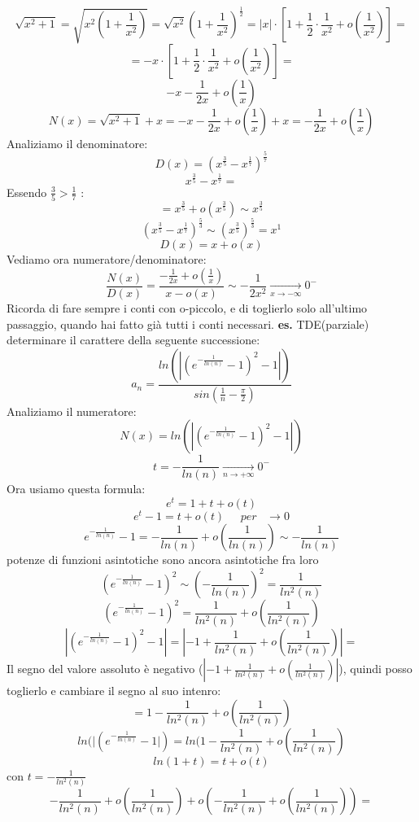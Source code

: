 \[
    \sqrt{x^2+1} = \sqrt{x^2(1+\frac{1}{x^2})} = \sqrt{x^2} (1 +\frac{1}{x^2})^{\frac{1}{2}} = |x| \cdot [1+\frac{1}{2}\cdot \frac{1}{x^2}+o(\frac{1}{x^2})] =
\]
\[
    = -x \cdot [1+\frac{1}{2}\cdot \frac{1}{x^2}+o(\frac{1}{x^2})] =
\]
\[
    -x - \frac{1}{2x} + o(\frac{1}{x})
\]
\[
    N(x) = \sqrt{x^2 +1} +x = -x -\frac{1}{2x} + o(\frac{1}{x}) +x = -\frac{1}{2x} + o(\frac{1}{x})
\]
Analiziamo il denominatore:
\[
    D(x) = (x^{\frac{3}{5}}-x^{\frac{1}{7}})^{\frac{5}{7}} 
\]
\[
    x^{\frac{3}{5}} - x^{\frac{1}{7}} = 
\]
Essendo $\frac{3}{5} > \frac{1}{7}$ :
\[
    = x^{\frac{3}{5}} + o(x^{\frac{3}{5}}) \sim  x^{\frac{3}{5}}
\]
\[
    (x^{\frac{3}{5}} - x^{\frac{1}{7}})^{\frac{5}{3}} \sim  (x^{\frac{3}{5}})^{\frac{5}{3}} = x^1
\]
\[
    D(x) = x + o(x)
\]
Vediamo ora numeratore/denominatore:
\[
    \frac{N(x)}{D(x)} = \frac{-\frac{1}{2x} + o(\frac{1}{x})}{x-o(x)} \sim  - \frac{1}{2x^2} \xrightarrow[x \rightarrow - \infty] \; 0^{-} 
\]
Ricorda di fare sempre i conti con o-piccolo, e di toglierlo solo all'ultimo passaggio, quando hai fatto già tutti i conti necessari.
\newline
\newline
\newline
\newline
\textbf{es.} TDE(parziale) determinare il carattere della seguente successione:
\[
    a_n = \frac{ln(|(e^{-\frac{1}{ln(n)}}-1)^2 - 1|)}{sin (\frac{1}{n} - \frac{\pi}{2})}
\]
Analiziamo il numeratore:
\[
    N(x) = ln(|(e^{-\frac{1}{ln(n)}}-1)^2 - 1|)
\]
\[
    t = -\frac{1}{ln(n)} \xrightarrow[n \rightarrow  + \infty] \; 0^{-} 
\]
Ora usiamo questa formula:
\[
    e^{t} = 1+t+o(t)
\]
\[
    e^{t} -1 = t+o(t) \;\;\;\;\; per \;\;\; \rightarrow  0
\]
\[
    e ^{-\frac{1}{ln(n)}} -1 = -\frac{1}{ln(n)} + o(\frac{1}{ln(n)}) \sim -\frac{1}{ln(n)}
\]
potenze di  funzioni asintotiche sono ancora asintotiche fra loro
\[
    (e ^{-\frac{1}{ln(n)}} -1) ^2 \sim (-\frac{1}{ln(n)})^2 = \frac{1}{ln^2(n)}
\]
\[
    (e ^{-\frac{1}{ln(n)}} -1) ^2 = \frac{ 1}{ln^2(n)} + o(\frac{ 1}{ln^2(n)} )
\]
\[
    |(e ^{-\frac{1}{ln(n)}} -1) ^2 -1| = |-1 + \frac{1}{ln^2(n)} + o(\frac{1}{ln^2(n)})| =
\]
Il segno del valore assoluto è negativo ($|-1 + \frac{1}{ln^2(n)} + o(\frac{1}{ln^2(n)})|$), quindi posso toglierlo e cambiare il segno al suo intenro:
\[
    = 1 - \frac{1}{ln^2(n)} + o(\frac{1}{ln^2(n)})
\]
\[
    ln(|(e^{-\frac{1}{ln(n)}}-1|) = ln(1- \frac{1}{ln^2(n)} + o(\frac{1}{ln^2(n)})
\]
\[
    ln(1+t) = t + o(t)
\]
con $t = -\frac{1}{ln^2(n)}$
\[
    -\frac{1}{ln^2(n)} + o (\frac{1}{ln^2(n)}) + o(-\frac{1}{ln^2(n)} + o(\frac{1}{ln^2(n)}))=
\]
